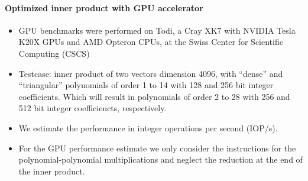 \documentclass[oribibl]{llncs2e/llncs}
\begin{document}
\paragraph{Optimized inner product with GPU accelerator}
\begin{itemize}
\item GPU benchmarks were performed on Todi, a Cray XK7 with NVIDIA Tesla K20X GPUs and AMD Opteron CPUs, at the Swiss Center for Scientific Computing (CSCS)
\item Testcase: inner product of two vectors dimension 4096, with ``dense'' and
``triangular'' polynomials of order 1 to 14 with 128 and 256 bit integer
coefficients. Which will result in polynomials of order 2 to 28 with 256 and 512 bit integer coefficiencts, respectively.
\item We estimate the performance in integer operations per second (IOP/s).
\item For the GPU performance estimate we only consider the instructions for the polynomial-polynomial multiplications and neglect the reduction at the end of the inner product.


\end{itemize}
\end{document}
